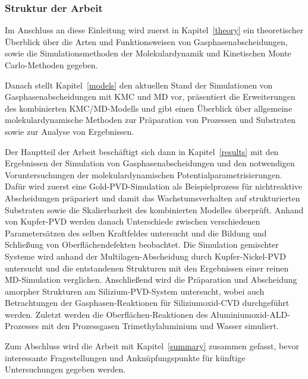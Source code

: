 \subsubsection{Struktur der Arbeit}

Im Anschluss an diese Einleitung wird zuerst in Kapitel~\ref{theory} ein theoretischer Überblick über die Arten und Funktionsweisen von Gasphasenabscheidungen, sowie die Simulationsmethoden der Molekulardynamik und Kinetischen Monte Carlo-Methoden gegeben.

Danach stellt Kapitel~\ref{models} den aktuellen Stand der Simulationen von Gasphasenabscheidungen mit KMC und MD vor, präsentiert die Erweiterungen des kombinierten KMC/MD-Modells und gibt einen Überblick über allgemeine molekulardynamische Methoden zur Präparation von Prozessen und Substraten sowie zur Analyse von Ergebnissen.

Der Hauptteil der Arbeit beschäftigt sich dann in Kapitel~\ref{results} mit den Ergebnissen der Simulation von Gasphasenabscheidungen und den notwendigen Voruntersuchungen der molekulardynamischen Potentialparametrisierungen.
Dafür wird zuerst eine Gold-PVD-Simulation als Beispielprozess für nichtreaktive Abscheidungen präpariert und damit das Wachstumsverhalten auf strukturierten Substraten sowie die Skalierbarkeit des kombinierten Modelles überprüft.
Anhand von Kupfer-PVD werden danach Unterschiede zwischen verschiedenen Parametersätzen des selben Kraftfeldes untersucht und die Bildung und Schließung von Oberflächendefekten beobachtet.
Die Simulation gemischter Systeme wird anhand der Multilagen-Abscheidung durch Kupfer-Nickel-PVD untersucht und die entstandenen Strukturen mit den Ergebnissen einer reinen MD-Simulation verglichen.
Anschließend wird die Präparation und Abscheidung amorpher Strukturen am Silizium-PVD-System untersucht, wobei auch Betrachtungen der Gasphasen-Reaktionen für Siliziumoxid-CVD durchgeführt werden.
Zuletzt werden die Oberflächen-Reaktionen des Aluminiumoxid-ALD-Prozesses mit den Prozessgasen Trimethylaluminium und Wasser simuliert.

Zum Abschluss wird die Arbeit mit Kapitel~\ref{summary} zusammen gefasst, bevor interessante Fragestellungen und Anknüpfungspunkte für künftige Untersuchungen gegeben werden.
